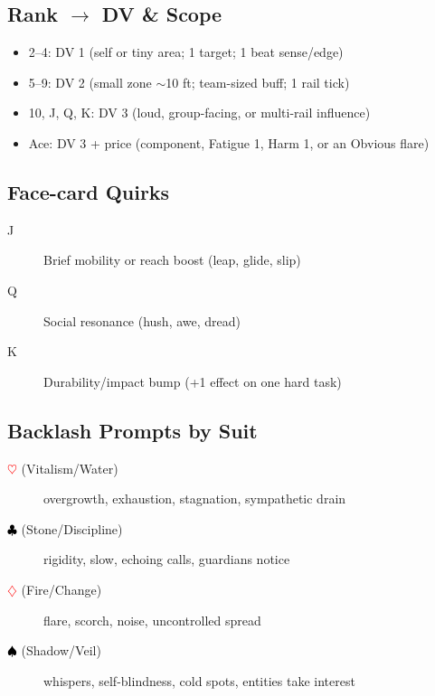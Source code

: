 \subsection{Rank $\rightarrow$ DV \& Scope}
\begin{itemize}
\item 2--4: DV 1 (self or tiny area; 1 target; 1 beat sense/edge)
\item 5--9: DV 2 (small zone $\sim$10 ft; team-sized buff; 1 rail tick)
\item 10, J, Q, K: DV 3 (loud, group-facing, or multi-rail influence)
\item Ace: DV 3 + price (component, Fatigue 1, Harm 1, or an Obvious flare)
\end{itemize}

\subsection{Face-card Quirks}
\begin{description}
\item[J] Brief mobility or reach boost (leap, glide, slip)
\item[Q] Social resonance (hush, awe, dread)
\item[K] Durability/impact bump (+1 effect on one hard task)
\end{description}

\subsection{Backlash Prompts by Suit}
\begin{description}
\item[\textcolor{red}{$\heartsuit$} (Vitalism/Water)] overgrowth, exhaustion, stagnation, sympathetic drain
\item[\textcolor{black}{$\clubsuit$} (Stone/Discipline)] rigidity, slow, echoing calls, guardians notice
\item[\textcolor{red}{$\diamondsuit$} (Fire/Change)] flare, scorch, noise, uncontrolled spread
\item[\textcolor{black}{$\spadesuit$} (Shadow/Veil)] whispers, self-blindness, cold spots, entities take interest
\end{description}

